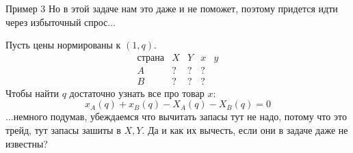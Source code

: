\documentclass{beamer}
\begin{document}
\begin{frame}{Пример 3}
Но в этой задаче нам это даже и не поможет, поэтому придется идти через избыточный спрос...

Пусть цены нормированы к $(1,q)$.
$$\begin{array}{c|c|c|c|c}
  \text{страна} & X & Y & x & y \\
  \hline
  A & ? & ? & ? &\\
  \hline
  B & ? & ? & ? &
\end{array}$$
Чтобы найти $q$ достаточно узнать все про товар $x$:
$$ x_A(q) + x_B(q) - X_A(q) - X_B(q) = 0$$
...немного подумав, убеждаемся что \alert{вычитать запасы тут не надо, потому что это трейд, тут запасы зашиты в $X,Y$}. Да и как их вычесть, если они в задаче даже не известны?
\end{frame}
\end{document}
